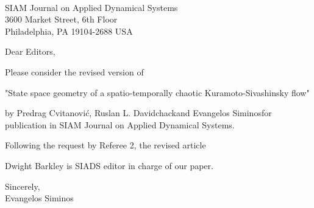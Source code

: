 \documentclass[12pt]{letter}
\date{April 10, 2009}
\begin{document}
\begin{letter}{
\\
SIAM Journal on Applied Dynamical Systems\\
3600 Market Street, 6th Floor\\
Philadelphia, PA 19104-2688 USA
}


\opening{Dear Editors,}

Please consider the revised version of

"State space geometry of a spatio-temporally chaotic Kuramoto-Sivashinsky flow"

by Predrag Cvitanovi\'c\footnotemark[1], Ruslan L. Davidchack\footnotemark[2]
and Evangelos Siminos\footnotemark[1] for publication in SIAM Journal on
Applied Dynamical Systems.

Following the request by Referee 2, the revised article


Dwight Barkley is SIADS editor in charge of our paper.

\renewcommand{\thefootnote}{\fnsymbol{footnote}}
\renewcommand{\thefootnote}{\arabic{footnote}}

\closing{Sincerely,\\ Evangelos Siminos}


\end{letter}
\end{document}
